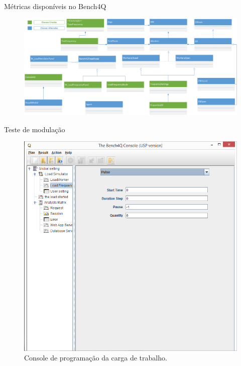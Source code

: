 	
\begin{frame}{Métricas disponíveis no Bench4Q}
	\begin{figure}[htb]
		\centering
		\includegraphics[scale=0.3]{../monograph/images/diagrama-classes-beanch4Q.png}	
	\end{figure}
\end{frame}

\begin{frame}{Teste de modulação}
	\begin{figure}[!htb]
		\centering
		\includegraphics[scale=0.3]{../monograph/images/console-bench4Q-usp.png}
		\caption{Console de programação da carga de trabalho.}
		\label{fig:interface-criada-beanch4q}
	\end{figure}
\end{frame}


